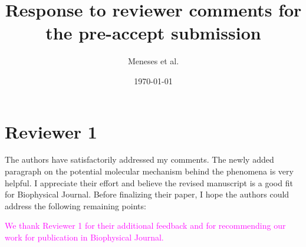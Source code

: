 \documentclass[11pt, letterpaper]{article}%
\title {Response to reviewer comments for the pre-accept submission}
\author{Meneses et al.}
\date{\today}
\newcommand{\response}{\textcolor{magenta}}
\begin{document}
\maketitle


\section*{Reviewer 1} The authors have satisfactorily addressed my comments. The newly added paragraph on the potential molecular mechanism behind the phenomena is very helpful. I appreciate their effort and believe the revised manuscript is a good fit for Biophysical Journal. Before finalizing their paper, I hope the authors could address the following remaining
points:

\response{We thank Reviewer 1 for their additional feedback and for recommending our work for publication in Biophysical Journal.}
\end{document}
